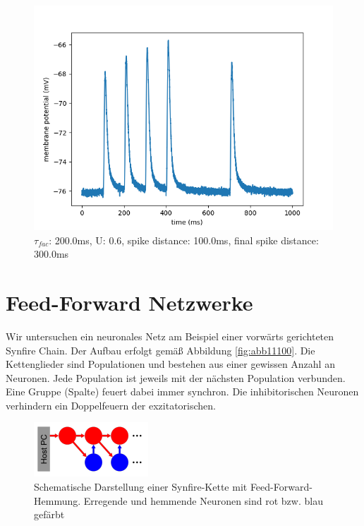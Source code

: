 \documentclass[10pt,a4paper]{scrartcl}
\begin{document}
\begin{figure} [ht]
\begin{center}
\label{fig:abb30}
\caption{$\tau_{fac}$: 200.0ms, U: 0.6, spike distance: 100.0ms, final spike distance: 300.0ms}
\includegraphics[scale=0.35]{pictures/final_spike_variation_20.pdf} 
\end{center}
\end{figure}


\newpage


\section{Feed-Forward Netzwerke}
Wir untersuchen ein neuronales Netz am Beispiel einer vorwärts gerichteten Synfire Chain. Der Aufbau erfolgt gemäß Abbildung \ref{fig:abb11100}. Die Kettenglieder sind Populationen und bestehen aus einer gewissen Anzahl an Neuronen. Jede Population ist jeweils mit der nächsten Population verbunden. Eine Gruppe (Spalte) feuert dabei immer synchron. Die inhibitorischen Neuronen verhindern ein Doppelfeuern der exzitatorischen. 

\begin{figure} [ht]
\begin{center}
\label{fig:abb4}
\caption{Schematische Darstellung einer Synfire-Kette mit Feed-Forward-Hemmung. Erregende und hemmende Neuronen sind rot bzw. blau gefärbt}
\includegraphics[scale=0.8]{pictures/synfire_chain.png}
\end{center}
\end{figure}
\end{document}
